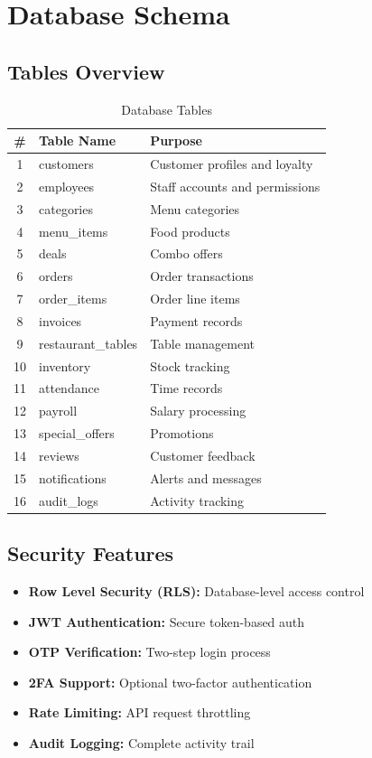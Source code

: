 \documentclass[12pt,a4paper]{article}
\begin{document}
\section{Database Schema}

\subsection{Tables Overview}

\begin{table}[h]
\centering
\begin{tabular}{@{}cll@{}}
\toprule
\textbf{\#} & \textbf{Table Name} & \textbf{Purpose} \\
\midrule
1 & customers & Customer profiles and loyalty \\
2 & employees & Staff accounts and permissions \\
3 & categories & Menu categories \\
4 & menu\_items & Food products \\
5 & deals & Combo offers \\
6 & orders & Order transactions \\
7 & order\_items & Order line items \\
8 & invoices & Payment records \\
9 & restaurant\_tables & Table management \\
10 & inventory & Stock tracking \\
11 & attendance & Time records \\
12 & payroll & Salary processing \\
13 & special\_offers & Promotions \\
14 & reviews & Customer feedback \\
15 & notifications & Alerts and messages \\
16 & audit\_logs & Activity tracking \\
\bottomrule
\end{tabular}
\caption{Database Tables}
\end{table}

\subsection{Security Features}

\begin{itemize}
    \item \textbf{Row Level Security (RLS):} Database-level access control
    \item \textbf{JWT Authentication:} Secure token-based auth
    \item \textbf{OTP Verification:} Two-step login process
    \item \textbf{2FA Support:} Optional two-factor authentication
    \item \textbf{Rate Limiting:} API request throttling
    \item \textbf{Audit Logging:} Complete activity trail
\end{itemize}
\end{document}
